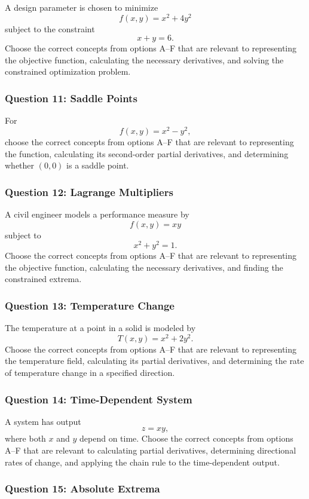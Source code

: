 \documentclass[a4paper,12pt]{article}
\theoremstyle{mystyle}
\numberwithin{equation}{section}
\numberwithin{theorem}{section}
\numberwithin{proposition}{section}
\numberwithin{example}{section}
\numberwithin{remark}{section}
\numberwithin{lemma}{section}
\numberwithin{corollary}{section}
\numberwithin{definition}{section}
\begin{document}
A design parameter is chosen to minimize
\[
f(x,y)=x^2+4y^2
\]
subject to the constraint
\[
x+y=6.
\]
Choose the correct concepts from options A--F that
are relevant to representing the objective function,
calculating the necessary derivatives, and solving
the constrained optimization problem.

\subsubsection*{Question 11: Saddle Points}

For
\[
f(x,y)=x^2-y^2,
\]
choose the correct concepts from options A--F that
are relevant to representing the function, calculating
its second-order partial derivatives, and determining
whether $(0,0)$ is a saddle point.

\subsubsection*{Question 12: Lagrange Multipliers}

A civil engineer models a performance measure by
\[
f(x,y)=xy
\]
subject to
\[
x^2+y^2=1.
\]
Choose the correct concepts from options A--F that
are relevant to representing the objective function,
calculating the necessary derivatives, and finding
the constrained extrema.

\subsubsection*{Question 13: Temperature Change}

The temperature at a point in a solid is modeled by
\[
T(x,y)=x^2+2y^2.
\]
Choose the correct concepts from options A--F that
are relevant to representing the temperature field,
calculating its partial derivatives, and determining
the rate of temperature change in a specified direction.

\subsubsection*{Question 14: Time-Dependent System}

A system has output
\[
z=xy,
\]
where both $x$ and $y$ depend on time. Choose the
correct concepts from options A--F that are relevant
to calculating partial derivatives, determining
directional rates of change, and applying the chain
rule to the time-dependent output.

\subsubsection*{Question 15: Absolute Extrema}
\end{document}
